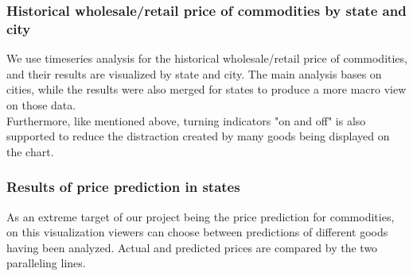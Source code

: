 \subsubsection*{Historical wholesale/retail price of commodities by state and city}
We use timeseries analysis for the historical wholesale/retail price of commodities, and their results are visualized by state and city. The main analysis bases on cities, while the results were also merged for states to produce a more macro view on those data.\\
Furthermore, like mentioned above, turning indicators "on and off" is also supported to reduce the distraction created by many goods being displayed on the chart.

\subsubsection*{Results of price prediction in states}
As an extreme target of our project being the price prediction for commodities, on this visualization viewers can choose between predictions of different goods having been analyzed. Actual and predicted prices are compared by the two paralleling lines.

